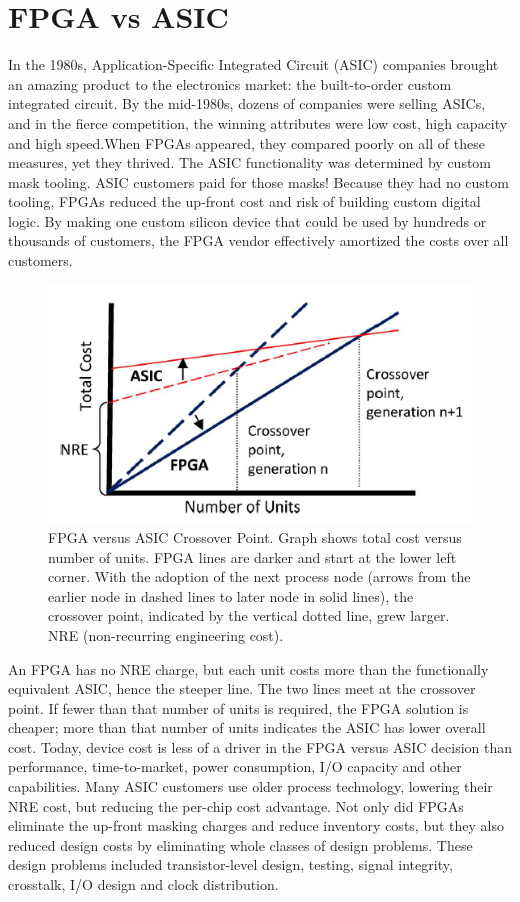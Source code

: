\section{FPGA vs ASIC}
\noindent In the 1980s, Application-Specific Integrated Circuit
(ASIC) companies brought an amazing product to the
electronics market: the built-to-order custom integrated
circuit. By the mid-1980s, dozens of companies were selling
ASICs, and in the fierce competition, the winning attributes
were low cost, high capacity and high speed.When
FPGAs appeared, they compared poorly on all of these
measures, yet they thrived. The ASIC functionality was determined by custom mask
tooling. ASIC customers paid for those masks!
Because they had no custom tooling, FPGAs reduced the up-front
cost and risk of building custom digital logic. By making
one custom silicon device that could be used by hundreds or
thousands of customers, the FPGA vendor effectively
amortized the costs over all customers.
\begin{figure}[H]
	\centering
	\includegraphics[width=0.7\linewidth]{IMG/ch3/COST}
	\caption{FPGA versus ASIC Crossover Point. Graph shows total cost
		versus number of units. FPGA lines are darker and start at the lower
		left corner. With the adoption of the next process node (arrows
		from the earlier node in dashed lines to later node in solid lines),
		the crossover point, indicated by the vertical dotted line, grew larger.
		NRE (non-recurring engineering cost).}
	\label{fig:cost}
\end{figure}     
\noindent  An FPGA has no NRE charge, but each unit costs more than the
functionally equivalent ASIC, hence the steeper line. The
two lines meet at the crossover point. If fewer than that
number of units is required, the FPGA solution is cheaper;
more than that number of units indicates the ASIC has
lower overall cost.
\newline
Today, device cost is less of a driver in the FPGA
versus ASIC decision than performance, time-to-market,
power consumption, I/O capacity and other capabilities. Many ASIC customers use older process technology,
lowering their NRE cost, but reducing the per-chip cost
advantage. Not only did FPGAs eliminate the up-front masking
charges and reduce inventory costs, but they also reduced
design costs by eliminating whole classes of design problems.
These design problems included transistor-level design,
testing, signal integrity, crosstalk, I/O design and
clock distribution.

